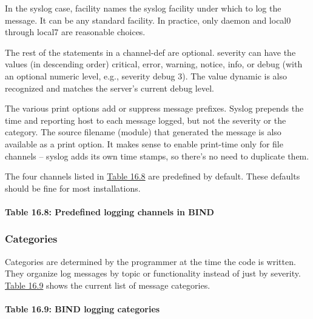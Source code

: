 In the syslog case, {facility} names the syslog facility under which to
log the message. It can be any standard facility. In practice, only
daemon and local0 through local7 are reasonable choices.

The rest of the statements in a {channel-def} are optional. {severity}
can have the values (in descending order) {critical}, {error},
{warning}, {notice}, {info}, or {debug} (with an optional numeric level,
e.g., {severity debug 3}). The value {dynamic} is also recognized and
matches the server's current debug level.

The various {print} options add or suppress message prefixes. Syslog
prepends the time and reporting host to each message logged, but not the
severity or the category. The source filename (module) that generated
the message is also available as a {print} option. It makes sense to
enable {print-time} only for file channels -- syslog adds its own time
stamps, so there's no need to duplicate them.

The four channels listed in
\protect\hyperlink{part0024_split_070.htmlux5cux23_idTextAnchor958}{Table
16.8} are predefined by default. These defaults should be fine for most
installations.

\paragraph[{Table 16.8: }Predefined logging channels in
BIND]{\texorpdfstring{{Table 16.8:
}\protect\hypertarget{part0024_split_070.htmlux5cux23_idTextAnchor958}{}{}Predefined
logging channels in
BIND}{Table 16.8: Predefined logging channels in BIND}}


\subsubsection[Categories]{\texorpdfstring{\protect\hypertarget{part0024_split_070.htmlux5cux23_idTextAnchor959}{}{}Categories}{Categories}}

Categories are determined by the programmer at the time the code is
written. They organize log messages by topic or functionality instead of
just by severity.
\protect\hyperlink{part0024_split_070.htmlux5cux23_idTextAnchor960}{Table
16.9} shows the current list of message categories.

\paragraph[{Table 16.9: }BIND logging categories]{\texorpdfstring{{Table
16.9:
}\protect\hypertarget{part0024_split_070.htmlux5cux23_idTextAnchor960}{}{}BIND
logging
categories\protect\hypertarget{part0024_split_070.htmlux5cux23_idIndexMarker2287}{}{}}{Table 16.9: BIND logging categories}}

